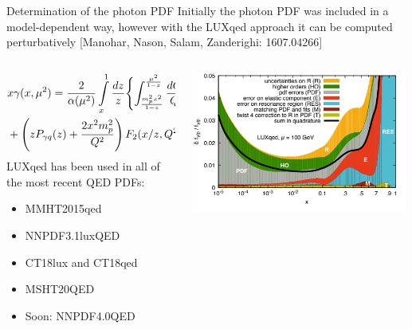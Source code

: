 \documentclass[aspectratio=169, 8pt,t]{beamer}
\begin{document}
\begin{frame}{Determination of the photon PDF}
  Initially the photon PDF was included in a model-dependent way, however with the LUXqed approach it can be computed perturbatively {\color{gray}\small [Manohar, Nason, Salam, Zanderighi: 1607.04266]}
  \begin{columns}[T]
    \begin{column}{0.59\textwidth}
      \begin{equation*}
        \begin{split}
          & x \gamma(x, \mu^2)
          =
          \frac{2}{\alpha (\mu^2)} \int\limits_x^1 \frac{dz}{z}
          \Biggl\{ \int_{m_p^2x^2 \over 1-z}^{\mu^2 \over 1-z} \frac{dQ^2}{Q^2}
          \alpha^2(Q^2) \Biggl[ -z^2 F_L(x/z, Q^2) \\
          & + \left( z P_{\gamma q}(z) + \frac{2 x^2 m_p^2}{Q^2} \right)
          F_2(x/z, Q^2)\Biggr] - \alpha^2(\mu^2) z^2 F_2(x/z, \mu^2)\Biggr\}
        \end{split}
      \end{equation*}
      LUXqed has been used in all of the most recent QED PDFs:
      \begin{itemize}
        \item MMHT2015qed
        \item NNPDF3.1luxQED
        \item CT18lux and CT18qed
        \item MSHT20QED
        \item Soon: NNPDF4.0QED
      \end{itemize}
    \end{column}

    \begin{column}{0.39\textwidth}
      \includegraphics[width=0.99\textwidth]{figures/luxQED_uncs.png}
    \end{column}
  \end{columns}
\end{frame}
\end{document}
